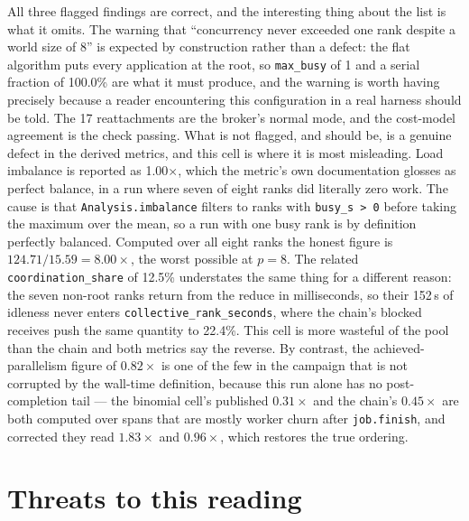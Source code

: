 \documentclass[11pt]{article}
\begin{document}
All three flagged findings are correct, and the interesting thing about the list is what
it omits. The warning that ``concurrency never exceeded one rank despite a world size of
8'' is expected by construction rather than a defect: the flat algorithm puts every
application at the root, so \texttt{max\_busy} of 1 and a serial fraction of 100.0\% are
what it must produce, and the warning is worth having precisely because a reader
encountering this configuration in a real harness should be told. The 17 reattachments
are the broker's normal mode, and the cost-model agreement is the check passing. What is
not flagged, and should be, is a genuine defect in the derived metrics, and this cell is
where it is most misleading. Load imbalance is
reported as 1.00$\times$, which the metric's own documentation glosses as perfect
balance, in a run where seven of eight ranks did literally zero work. The cause is that
\texttt{Analysis.imbalance} filters to ranks with \texttt{busy\_s > 0} before taking the
maximum over the mean, so a run with one busy rank is by definition perfectly balanced.
Computed over all eight ranks the honest figure is $124.71 / 15.59 = 8.00\times$, the
worst possible at $p = 8$. The related \texttt{coordination\_share} of 12.5\% understates
the same thing for a different reason: the seven non-root ranks return from the reduce in
milliseconds, so their 152\,s of idleness never enters
\texttt{collective\_rank\_seconds}, where the chain's blocked receives push the same
quantity to 22.4\%. This cell is more wasteful of the pool than the chain and both
metrics say the reverse. By contrast, the achieved-parallelism figure of $0.82\times$ is
one of the few in the campaign that is not corrupted by the wall-time definition, because
this run alone has no post-completion tail --- the binomial cell's published
$0.31\times$ and the chain's $0.45\times$ are both computed over spans that are mostly
worker churn after \texttt{job.finish}, and corrected they read $1.83\times$ and
$0.96\times$, which restores the true ordering.

\section{Threats to this reading}
\end{document}
